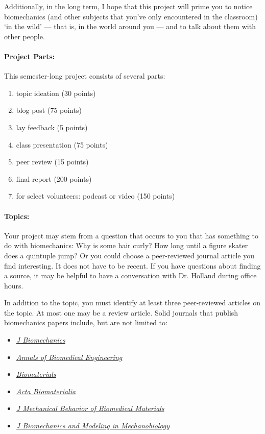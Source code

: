 \documentclass[11pt]{article}
\begin{document}
Additionally, in the long term, I hope that this project will prime you to notice biomechanics (and other subjects that you've only encountered in the classroom) `in the wild' --- that is, in the world around you --- and to talk about them with other people.

\paragraph{Project Parts:}
This semester-long project consists of several parts: 
\begin{enumerate}
\item topic ideation (30 points)
\item blog post (75 points)
\item lay feedback (5 points)
\item class presentation (75 points)
\item peer review (15 points)
\item final report (200 points)
\item for select volunteers: podcast or video (150 points)
\end{enumerate}

\paragraph{Topics:}
Your project may stem from a question that occurs to you that has something to do with biomechanics: 
Why is some hair curly?  
How long until a figure skater does a quintuple jump?  
Or you could choose a peer-reviewed journal article you find interesting.
It does not have to be recent. 
If you have questions about finding a source, it may be helpful to have a conversation with Dr. Holland during office hours.

In addition to the topic, you must identify at least three peer-reviewed articles on the topic.  At most one may be a review article.  
Solid journals that publish biomechanics papers include, but are not limited to: 
\begin{itemize} 
    \item \href{https://www.journals.elsevier.com/journal-of-biomechanics}{\it J Biomechanics} 
    \item \href{https://link.springer.com/journal/10439}{\it Annals of Biomedical Engineering} 
    \item \href{https://www.journals.elsevier.com/biomaterials}{\it Biomaterials} 
    \item \href{https://www.journals.elsevier.com/acta-biomaterialia}{\it Acta Biomaterialia} 
    \item \href{https://www.journals.elsevier.com/journal-of-the-mechanical-behavior-of-biomedical-materials}{\it J Mechanical Behavior of Biomedical Materials} 
    \item \href{https://link.springer.com/journal/10237}{\it J Biomechanics and Modeling in Mechanobiology}
\end{itemize}
\end{document}
